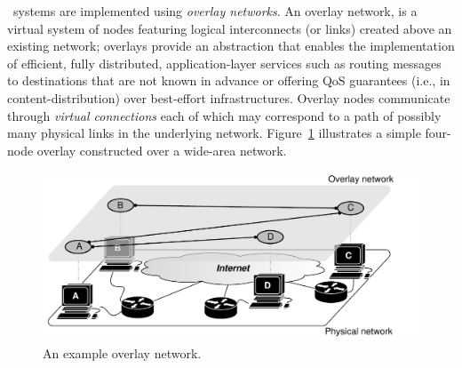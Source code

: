 \p\ systems are implemented using \emph{overlay networks}. 
An overlay network, is a virtual system of nodes featuring logical interconnects (or links)
created above an existing network; overlays provide an abstraction that
enables the implementation of efficient, fully distributed, application-layer
services such as routing messages to destinations that are not known in advance
or offering QoS guarantees (i.e., in content-distribution) over best-effort
infrastructures. Overlay nodes communicate through \emph{virtual connections}
each of which may correspond to a path of possibly many physical links 
in the underlying network.
Figure~\ref{figure:overlay} illustrates a simple four-node overlay constructed
over a wide-area network.
\begin{figure}[ht]
\centering
  \includegraphics[scale=0.45]{img/pdf/under-over-lay.pdf}
\caption{An example overlay network.}
\label{figure:overlay}
\end{figure}

